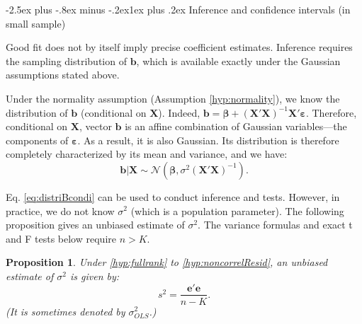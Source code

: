 \documentclass[
  11pt,
]{book}
\makeatletter
\renewcommand\subsection{\@startsection{subsection}{2}{\z@}
  {-2.5ex plus -.8ex minus -.2ex}{1ex plus .2ex}
  {\normalfont\large\bfseries\color{TextbookInk}}}
\newtheorem{proposition}{Proposition}[chapter]
\theoremstyle{definition}
\theoremstyle{definition}
\theoremstyle{definition}
\theoremstyle{definition}
\theoremstyle{remark}
\makeatother
\begin{document}
\subsection{Inference and confidence intervals (in small sample)}\label{inference-and-confidence-intervals-in-small-sample}

Good fit does not by itself imply precise coefficient estimates. Inference requires the sampling distribution of \(\mathbf{b}\), which is available exactly under the Gaussian assumptions stated above.

Under the normality assumption (Assumption \ref{hyp:normality}), we know the distribution of \(\mathbf{b}\) (conditional on \(\mathbf{X}\)). Indeed, \(\mathbf{b} = \boldsymbol\beta + (\mathbf{X}'\mathbf{X})^{-1} \mathbf{X}'\boldsymbol\varepsilon\). Therefore, conditional on \(\mathbf{X}\), vector \(\mathbf{b}\) is an affine combination of Gaussian variables---the components of \(\boldsymbol\varepsilon\). As a result, it is also Gaussian. Its distribution is therefore completely characterized by its mean and variance, and we have:
\begin{equation}
\mathbf{b}|\mathbf{X} \sim \mathcal{N}(\boldsymbol\beta,\sigma^2(\mathbf{X}'\mathbf{X})^{-1}).\label{eq:distriBcondi}
\end{equation}

Eq. \eqref{eq:distriBcondi} can be used to conduct inference and tests. However, in practice, we do not know \(\sigma^2\) (which is a population parameter). The following proposition gives an unbiased estimate of \(\sigma^2\). The variance formulas and exact t and F tests below require \(n>K\).

\begin{proposition}
\protect\hypertarget{prp:expects2}{}\label{prp:expects2}Under \ref{hyp:fullrank} to \ref{hyp:noncorrelResid}, an unbiased estimate of \(\sigma^2\) is given by:
\begin{equation}
s^2 = \frac{\mathbf{e}'\mathbf{e}}{n-K}.\label{eq:s2}
\end{equation}
(It is sometimes denoted by \(\sigma^2_{OLS}\).)
\end{proposition}
\end{document}
